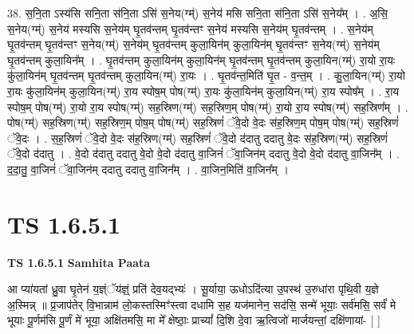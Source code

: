 \documentclass[17pt]{extarticle}
\begin{document}
38. स॒नि॒ता ऽस्य॑सि सनि॒ता स॑नि॒ता ऽसि॑ स॒नेय(ग्म्॑) स॒नेय॑ मसि सनि॒ता स॑नि॒ता ऽसि॑ स॒नेय᳚म् । . अ॒सि॒ स॒नेय(ग्म्॑) स॒नेय॑ मस्यसि स॒नेय॑म् घृ॒तव॑न्तम् घृ॒तव॑न्तꣳ स॒नेय॑ मस्यसि स॒नेय॑म् घृ॒तव॑न्तम् । . स॒नेय॑म् घृ॒तव॑न्तम् घृ॒तव॑न्तꣳ स॒नेय(ग्म्॑) स॒नेय॑म् घृ॒तव॑न्तम् कुला॒यिन॑म् कुला॒यिन॑म् घृ॒तव॑न्तꣳ स॒नेय(ग्म्॑) स॒नेय॑म् घृ॒तव॑न्तम् कुला॒यिन᳚म् । . घृ॒तव॑न्तम् कुला॒यिन॑म् कुला॒यिन॑म् घृ॒तव॑न्तम् घृ॒तव॑न्तम् कुला॒यिन(ग्म्॑) रा॒यो रा॒यः कु॑ला॒यिन॑म् घृ॒तव॑न्तम् घृ॒तव॑न्तम् कुला॒यिन(ग्म्॑) रा॒यः । . घृ॒तव॑न्त॒मिति॑ घृ॒त - व॒न्त॒म् । . कु॒ला॒यिन(ग्म्॑) रा॒यो रा॒यः कु॑ला॒यिन॑म् कुला॒यिन(ग्म्॑) रा॒य स्पोष॒म् पोष(ग्म्॑) रा॒यः कु॑ला॒यिन॑म् कुला॒यिन(ग्म्॑) रा॒य स्पोष᳚म् । . रा॒य स्पोष॒म् पोष(ग्म्॑) रा॒यो रा॒य स्पोष(ग्म्॑) सह॒स्रिण(ग्म्॑) सह॒स्रिण॒म् पोष(ग्म्॑) रा॒यो रा॒य स्पोष(ग्म्॑) सह॒स्रिण᳚म् । . पोष(ग्म्॑) सह॒स्रिण(ग्म्॑) सह॒स्रिण॒म् पोष॒म् पोष(ग्म्॑) सह॒स्रिणं॑ ॅवे॒दो वे॒दः स॑ह॒स्रिण॒म् पोष॒म् पोष(ग्म्॑) सह॒स्रिणं॑ ॅवे॒दः । . स॒ह॒स्रिणं॑ ॅवे॒दो वे॒दः स॑ह॒स्रिण(ग्म्॑) सह॒स्रिणं॑ ॅवे॒दो द॑दातु ददातु वे॒दः स॑ह॒स्रिण(ग्म्॑) सह॒स्रिणं॑ ॅवे॒दो द॑दातु । . वे॒दो द॑दातु ददातु वे॒दो वे॒दो द॑दातु वा॒जिनं॑ ॅवा॒जिन॑म् ददातु वे॒दो वे॒दो द॑दातु वा॒जिन᳚म् । . द॒दा॒तु॒ वा॒जिनं॑ ॅवा॒जिन॑म् ददातु ददातु वा॒जिन᳚म् । . वा॒जिन॒मिति॑ वा॒जिन᳚म् । \newline
\pagebreak
{}
\section*{ TS 1.6.5.1 }

\textbf{TS 1.6.5.1 } \newline
\textbf{Samhita Paata} \newline

आ प्या॑यतां ध्रु॒वा घृ॒तेन॑ य॒ज्ञ्ंॅय॑ज्ञ्ं॒ प्रति॑ देव॒यद्भ्यः॑ । सू॒र्याया॒ ऊधोऽदि॑त्या उ॒पस्थ॑ उ॒रुधा॑रा पृथि॒वी य॒ज्ञे अ॒स्मिन्न् ॥ प्र॒जाप॑तेर् वि॒भान्नाम॑ लो॒कस्तस्मिꣳ॑स्त्वा दधामि स॒ह यज॑मानेन॒ सद॑सि॒ सन्मे॑ भूयाः॒ सर्व॑मसि॒ सर्वं॑ मे भूयाः पू॒र्णम॑सि पू॒र्णं मे॑ भूया॒ अक्षि॑तमसि॒ मा मे᳚ क्षेष्ठाः॒ प्राच्यां᳚ दि॒शि दे॒वा ऋ॒त्विजो॑ मार्जयन्तां॒ दक्षि॑णायां- [ ] \newline
\end{document}

